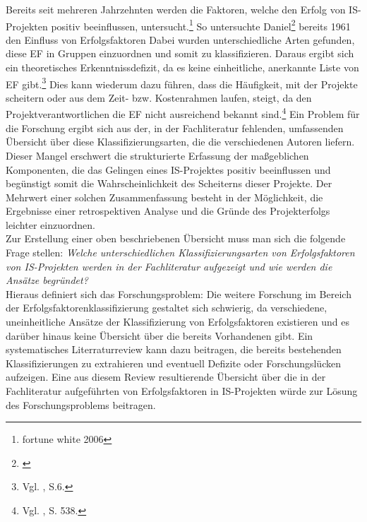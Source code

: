 Bereits seit mehreren Jahrzehnten werden die Faktoren, welche den Erfolg von IS-\-Pro\-jek\-ten positiv beeinflussen, untersucht.\footnote{fortune white 2006}
So untersuchte Daniel\footnote{\cite{Daniel.1961}} bereits 1961 den Einfluss von Erfolgsfaktoren\todo{\ldots}
Dabei wurden unterschiedliche Arten gefunden, diese \ac{EF} in Gruppen einzuordnen und somit zu klassifizieren.
Daraus ergibt sich ein theoretisches Erkenntnissdefizit, da es keine einheitliche, anerkannte Liste von \ac{EF} gibt.\footnote{Vgl. \cite{vanScoter.2011}, S.6.} 
Dies kann wiederum dazu führen, dass die Häufigkeit, mit der Projekte scheitern oder aus dem Zeit- bzw. Kostenrahmen laufen, 
steigt, da den Projektverantwortlichen die \ac{EF} nicht ausreichend bekannt sind.\footnote{Vgl. \cite{Sudhakar.2012}, S. 538.}
Ein Problem für die Forschung ergibt sich aus der, in der Fachliteratur fehlenden, umfassenden Übersicht über diese Klassifizierungsarten, die die verschiedenen Autoren liefern.
Dieser Mangel erschwert die strukturierte Erfassung der maßgeblichen Komponenten, die das Gelingen eines IS-Projektes positiv beeinflussen und begünstigt somit die Wahrscheinlichkeit des Scheiterns dieser Projekte.
Der Mehrwert einer solchen Zusammenfassung besteht in der Möglichkeit, die Ergebnisse einer retrospektiven Analyse und die Gründe des Projekterfolgs leichter einzuordnen.
\\Zur Erstellung einer oben beschriebenen Übersicht muss man sich die folgende Frage stellen:
\textit{Welche unterschiedlichen Klassifizierungsarten von Erfolgsfaktoren von IS-Projekten werden in der Fachliteratur aufgezeigt und wie werden die Ansätze begründet?}\\
Hieraus definiert sich das Forschungsproblem:
Die weitere Forschung im Bereich der Erfolgsfaktorenklassifizierung gestaltet sich schwierig, da
verschiedene, uneinheitliche Ansätze der Klassifizierung von Erfolgsfaktoren existieren und es darüber hinaus keine Übersicht über die bereits  Vorhandenen gibt.
Ein systematisches Literraturreview kann dazu beitragen, die bereits bestehenden Klassifizierungen zu extrahieren 
und eventuell Defizite oder Forschungslücken aufzeigen.
Eine aus diesem Review resultierende Übersicht über die in der Fachliteratur aufgeführten \KAS von 
Erfolgsfaktoren in IS-Projekten würde zur Lösung des Forschungsproblems beitragen.